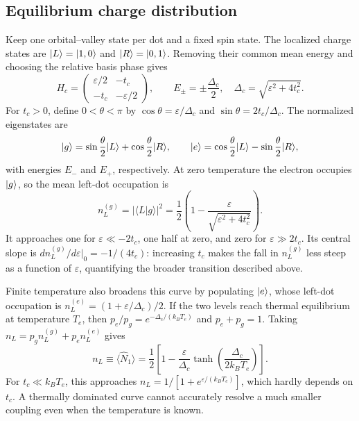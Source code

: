 \subsection{Equilibrium charge distribution}
\label{sec:measurement-equilibrium-charge}
Keep one orbital--valley state per dot and a fixed spin state.
The localized charge states are $\lvert L\rangle=\lvert 1,0\rangle$ and
$\lvert R\rangle=\lvert 0,1\rangle$. Removing their common mean energy and
choosing the relative basis phase gives
\begin{equation}
 H_c=\begin{pmatrix}\varepsilon/2&-t_c\\-t_c&-\varepsilon/2\end{pmatrix},
 \qquad
 E_\pm=\pm\frac{\Delta_c}{2},\quad
 \Delta_c=\sqrt{\varepsilon^2+4t_c^2}.
 \label{eq:measurement-charge-anticrossing}
\end{equation}
For $t_c>0$, define $0<\theta<\pi$ by
$\cos\theta=\varepsilon/\Delta_c$ and
$\sin\theta=2t_c/\Delta_c$. The normalized eigenstates are
\begin{equation}
 \ket g=\sin\frac\theta2\ket L+\cos\frac\theta2\ket R,
 \qquad
 \ket e=\cos\frac\theta2\ket L-\sin\frac\theta2\ket R,
 \label{eq:measurement-charge-eigenstates}
\end{equation}
with energies $E_-$ and $E_+$, respectively. At zero temperature
the electron occupies $\lvert g\rangle$, so the mean left-dot occupation is
\begin{equation}
 n_L^{(g)}=|\langle L|g\rangle|^2
       =\frac12\left(1-\frac{\varepsilon}
                            {\sqrt{\varepsilon^2+4t_c^2}}\right).
 \label{eq:measurement-ground-charge-occupation}
\end{equation}
It approaches one for $\varepsilon\ll-2t_c$, one half at zero,
and zero for $\varepsilon\gg2t_c$. Its central slope is
$dn_L^{(g)}/d\varepsilon|_0=-1/(4t_c)$: increasing $t_c$ makes
the fall in $n_L^{(g)}$ less steep as a function of $\varepsilon$,
quantifying the broader transition described above.

Finite temperature also broadens this curve by populating
$\lvert e\rangle$, whose left-dot occupation is
$n_L^{(e)}=(1+\varepsilon/\Delta_c)/2$.
If the two levels reach thermal equilibrium at temperature $T_e$,
then $p_e/p_g=e^{-\Delta_c/(k_BT_e)}$ and $p_e+p_g=1$.
Taking $n_L=p_g n_L^{(g)}+p_e n_L^{(e)}$ gives
\begin{equation}
 n_L\equiv\langle\widehat N_1\rangle
    =\frac12\left[1-\frac{\varepsilon}{\Delta_c}
                  \tanh\!\left(\frac{\Delta_c}{2k_BT_e}\right)\right].
 \label{eq:measurement-charge-polarization}
\end{equation}
For $t_c\ll k_BT_e$, this approaches
$n_L=1/[1+e^{\varepsilon/(k_BT_e)}]$, which hardly depends on
$t_c$. A thermally dominated curve cannot accurately resolve a
much smaller coupling even when the temperature is known.

